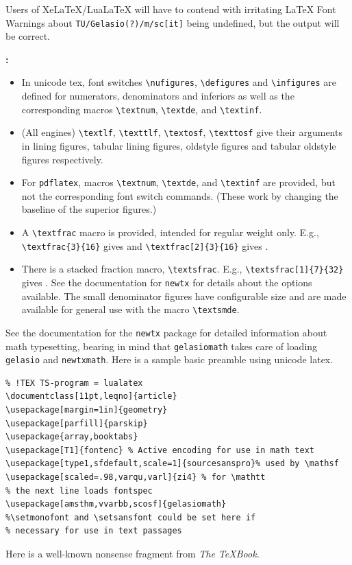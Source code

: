 \documentclass[11pt]{article}
\begin{document}
Users of XeLaTeX/LuaLaTeX will have to contend with irritating LaTeX Font Warnings about \verb|TU/Gelasio(?)/m/sc[it]| being undefined, but the output will be correct.

{\bfseries{}:}
\begin{itemize}
\item
In unicode tex, font switches \verb|\nufigures|, \verb|\defigures| and \verb|\infigures| are defined for numerators, denominators and inferiors as well as the corresponding macros \verb|\textnum|, \verb|\textde|, and \verb|\textinf|.
\item (All engines)
\verb|\textlf|, \verb|\texttlf|, \verb|\textosf|, \verb|\texttosf| give their arguments in lining figures, tabular lining figures, oldstyle figures and tabular oldstyle figures respectively.
\item For {\tt pdflatex}, macros \verb|\textnum|, \verb|\textde|, and \verb|\textinf| are provided, but not the corresponding font switch commands. (These work by changing the baseline of the superior figures.) 
\item A \verb|\textfrac| macro is provided, intended for regular weight only. E.g., \verb|\textfrac{3}{16}| gives  and \verb|\textfrac[2]{3}{16}| gives .
\item
There is a stacked fraction macro, \verb|\textsfrac|. E.g.,  
\verb|\textsfrac[1]{7}{32}| gives . See the documentation for {\tt newtx} for details about the options available. The small denominator figures have configurable size and are made available for general use with the macro \verb|\textsmde|.
\end{itemize} 
See the documentation  for the {\tt newtx} package for detailed information about math typesetting, bearing in mind that {\tt gelasiomath} takes care of loading {\tt gelasio} and {\tt newtxmath}. Here is a sample basic preamble using unicode latex.

\begin{verbatim}
% !TEX TS-program = lualatex
\documentclass[11pt,leqno]{article}
\usepackage[margin=1in]{geometry}
\usepackage[parfill]{parskip}
\usepackage{array,booktabs}
\usepackage[T1]{fontenc} % Active encoding for use in math text
\usepackage[type1,sfdefault,scale=1]{sourcesanspro}% used by \mathsf
\usepackage[scaled=.98,varqu,varl]{zi4} % for \mathtt
% the next line loads fontspec
\usepackage[amsthm,vvarbb,scosf]{gelasiomath} 
%\setmonofont and \setsansfont could be set here if
% necessary for use in text passages
\end{verbatim}
Here is a well-known nonsense fragment from \emph{The TeXBook.}
\end{document}
